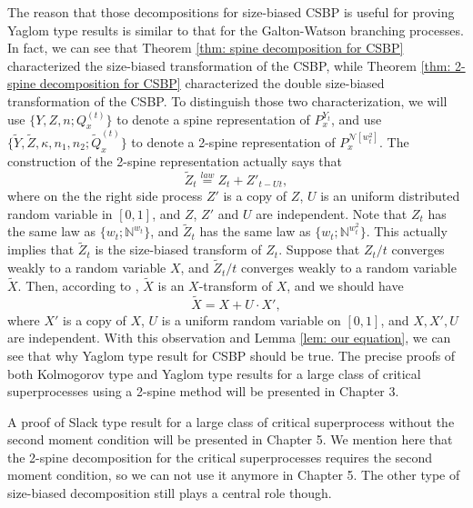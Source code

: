 \documentclass[UTF8]{pkuthss}
\theoremstyle{plain}
\theoremstyle{definition}
\numberwithin{equation}{section}
\begin{document}
	The reason that those decompositions for size-biased CSBP is useful for proving Yaglom type results is similar to that for the Galton-Watson branching processes. 
	In fact, we can see that Theorem \ref{thm: spine decomposition for CSBP} characterized the size-biased transformation of the CSBP, while Theorem \ref{thm: 2-spine decomposition for CSBP} characterized the double size-biased transformation of the CSBP. To distinguish those two characterization, we will use $\{Y, Z, n; Q_x^{(t)}\}$ to denote a spine representation of $P_x^{Y_t}$, and use $\{\tilde Y, \tilde Z, \kappa, n_1, n_2; \tilde Q_x^{(t)}\}$ to denote a 2-spine representation of $P_x^{\mathcal N[w_t^2]}$. 
	The construction of the 2-spine representation actually says that
\[
	\tilde Z_t \overset{law}{=} Z_t + Z'_{t-Ut},
\]
	where on the the right side process $Z'$ is a copy of $Z$, $U$ is an uniform distributed random variable in $[0,1]$, and $Z$, $Z'$ and $U$ are independent.
  	Note that $Z_t$ has the same law as $\{w_t;\mathbb N^{w_t}\}$, and $\tilde Z_t$ has the same law as $\{w_t;\mathbb N^{w^2_t}\}$. This actually implies that $\tilde Z_t$ is the size-biased transform of $Z_t$. 
  	Suppose that $Z_t/t$ converges weakly to a random variable $X$, and $\tilde Z_t/t$ converges weakly to a random variable $\tilde X$.
	Then, according to \cite[Lemma 4.3]{LyonsPemantlePeres1995Conceptual}, $\tilde X$ is an $X$-transform of $X$, and we should have
\[
	\tilde X = X+U\cdot X',
\]
	where $X'$ is a copy of $X$, $U$ is a uniform random variable on $[0,1]$, and $X,X',U$ are independent. With this observation and Lemma \ref{lem: our equation}, we can see that why Yaglom type result for CSBP should be true.  The precise proofs of both Kolmogorov type and Yaglom type results for a large class of critical superprocesses using a 2-spine method will be presented in Chapter 3.

	A proof of Slack type result for a large class of critical superprocess without the second moment condition will be presented in Chapter 5. We mention here that the 2-spine decomposition for the critical superprocesses requires the second moment condition, so we can not use it anymore in Chapter 5. The other type of size-biased decomposition still plays a central role though. 
\end{document}
